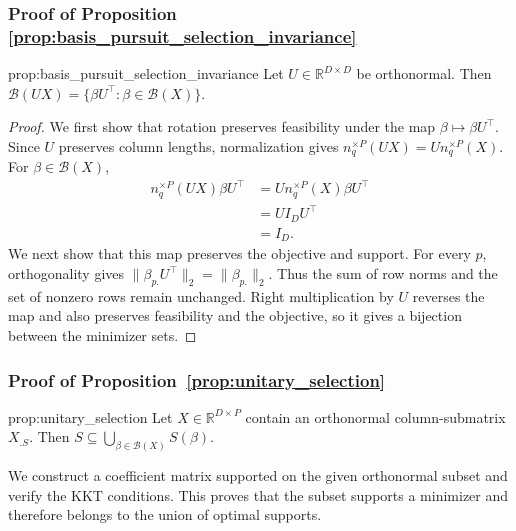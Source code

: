 \subsubsection{Proof of Proposition \ref{prop:basis_pursuit_selection_invariance}}
\label{proof:basis_pursuit_program_invariance}

\begin{restatedproposition}{prop:basis_pursuit_selection_invariance}
Let $U \in \mathbb R^{D \times D}$ be orthonormal.
Then $\mathcal B(UX)=\{\beta U^\top:\beta\in\mathcal B(X)\}$.
\end{restatedproposition}

\begin{proof}
We first show that rotation preserves feasibility under the map $\beta\mapsto\beta U^\top$.
Since $U$ preserves column lengths, normalization gives $n_q^{\times P}(UX)=U n_q^{\times P}(X)$.
For $\beta\in\mathcal B(X)$,
\begin{align}
n_q^{\times P}(UX)\beta U^\top
&=U n_q^{\times P}(X)\beta U^\top \\
&=UI_DU^\top \\
&=I_D.
\end{align}
We next show that this map preserves the objective and support.
For every $p$, orthogonality gives $\|\beta_{p.}U^\top\|_2=\|\beta_{p.}\|_2$.
Thus the sum of row norms and the set of nonzero rows remain unchanged.
Right multiplication by $U$ reverses the map and also preserves feasibility and the objective, so it gives a bijection between the minimizer sets.
\end{proof}

\subsubsection{Proof of Proposition~\ref{prop:unitary_selection}}
\label{proof:unitary_selection}

\begin{restatedproposition}{prop:unitary_selection}
Let $X\in\mathbb R^{D\times P}$ contain an orthonormal column-submatrix $X_{.S}$.
Then $S\subseteq\bigcup_{\beta\in\mathcal B(X)}S(\beta)$.
\end{restatedproposition}

We construct a coefficient matrix supported on the given orthonormal subset and verify the KKT conditions.
This proves that the subset supports a minimizer and therefore belongs to the union of optimal supports.


